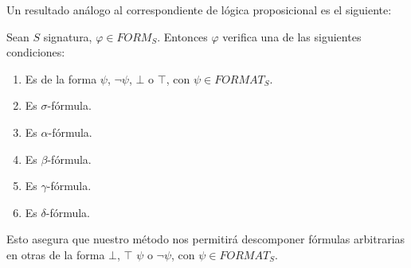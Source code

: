 Un resultado análogo al correspondiente de lógica proposicional es el siguiente:

\begin{prop}
Sean $S$ signatura, $\varphi \in FORM_S$. Entonces $\varphi$ verifica una de las siguientes condiciones:
\begin{enumerate}
    \item Es de la forma $\psi$, $\neg \psi$, $\bot$ o $\top$, con $\psi \in FORMAT_S$.
    \item Es $\sigma$-fórmula.
    \item Es $\alpha$-fórmula.
    \item Es $\beta$-fórmula.
    \item Es $\gamma$-fórmula.
    \item Es $\delta$-fórmula.
\end{enumerate}
\end{prop}

Esto asegura que nuestro método nos permitirá descomponer fórmulas arbitrarias en otras de la forma $\bot$, $\top$ $\psi$ o $\neg \psi$, con $\psi \in FORMAT_S$. \\\

